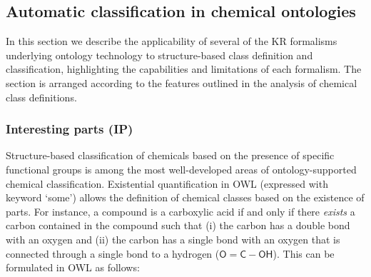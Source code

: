 \documentclass[10pt]{bmc_article}
\newenvironment{bmcformat}{\baselineskip20pt\sloppy\setboolean{publ}{false}}{\baselineskip20pt\sloppy}
\begin{document}
\begin{bmcformat}
\subsection*{Automatic classification in chemical ontologies}
\label{sec:resultschemontology}

In this section we describe the applicability of several of the KR formalisms underlying ontology technology to structure-based class definition and classification, highlighting the capabilities and limitations of each formalism. The section is arranged according to the features outlined in the analysis of chemical class definitions.

% 


\subsubsection*{Interesting parts (IP)}


Structure-based classification of chemicals based on the presence of specific functional groups is among the most well-developed areas of ontology-supported chemical classification. Existential quantification in OWL (expressed with keyword `some') allows the definition of chemical classes based on the existence of parts. For instance, a compound is a carboxylic acid if and only if there \emph{exists} a carbon contained in the compound such that (i) the carbon has a double bond with an oxygen and (ii) the carbon has a single bond with an oxygen that is connected through a single bond to a hydrogen ($\mathsf{O=C-OH}$). This can be formulated in OWL as follows:

%


\end{bmcformat}
\end{document}

